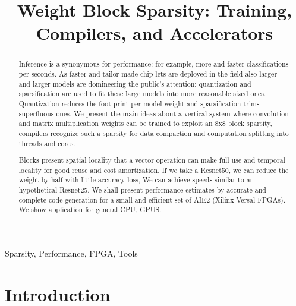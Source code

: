 \documentclass[conference]{IEEEtran}
\begin{document}
\title{Weight Block Sparsity: Training, Compilers, and Accelerators  }

\author{
  \and
  \and
  \and
  \and
  \and
  \and
}

\maketitle

\begin{abstract}
Inference is a synonymous for performance: for example, more and
faster classifications per seconds. As faster and tailor-made
chip-lets are deployed in the field also larger and larger models are
domineering the public's attention: quantization and sparsification
are used to fit these large models into more reasonable sized
ones. Quantization reduces the foot print per model weight and
sparsification trims superfluous ones.  We present the main ideas
about a vertical system where convolution and matrix multiplication
weights can be trained to exploit an 8x8 block sparsity, compilers
recognize such a sparsity for data compaction and computation
splitting into threads and cores.

Blocks present spatial locality that a vector operation can make full
use and temporal locality for good reuse and cost amortization. If we
take a Resnet50, we can reduce the weight by half with little accuracy
loss, We can achieve speeds similar to an hypothetical Resnet25. We
shall present performance estimates by accurate and complete code
generation for a small and efficient set of AIE2 (Xilinx Versal
FPGAs). We show application for general CPU, GPUS.

\end{abstract}


\begin{IEEEkeywords}
Sparsity, Performance, FPGA, Tools
\end{IEEEkeywords}

\section{Introduction}
\label{sec:introduction}
\end{document}
